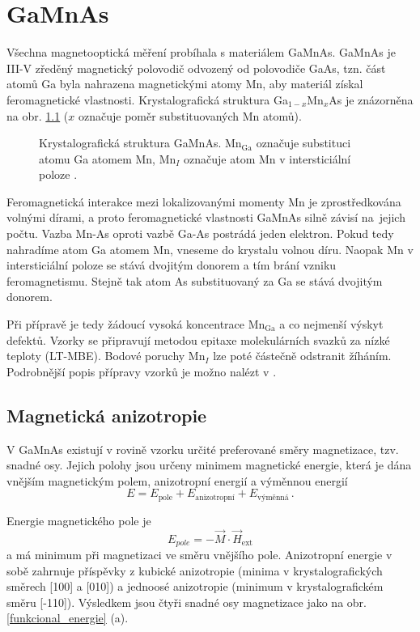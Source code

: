 \chapter{GaMnAs}

Všechna magnetooptická měření probíhala s materiálem GaMnAs. GaMnAs je III-V zředěný magnetický polovodič odvozený od polovodiče GaAs, tzn. část atomů Ga byla nahrazena magnetickými atomy Mn, aby materiál získal feromagnetické vlastnosti. Krystalografická struktura Ga$_{1-x}$Mn$_x$As je znázorněna na obr. \ref{gamnasstruktura_reichlova} ($x$ označuje poměr substituovaných Mn atomů).


\begin{figure}[htbp]\centering
{}
	\caption{Krystalografická struktura GaMnAs. Mn$_\text{Ga}$ označuje substituci atomu Ga atomem Mn, Mn$_I$ označuje atom Mn v intersticiální poloze \cite{Reichlova}.}\label{gamnasstruktura_reichlova}
\end{figure}

Feromagnetická interakce mezi lokalizovanými momenty Mn je zprostředkována volnými dírami, a proto feromagnetické vlastnosti GaMnAs silně závisí na~jejich počtu. Vazba Mn-As oproti vazbě Ga-As postrádá jeden elektron. Pokud tedy nahradíme atom Ga atomem Mn, vneseme do krystalu volnou díru. Naopak Mn v intersticiální poloze se stává dvojitým donorem a tím brání vzniku feromagnetismu. Stejně tak atom As substituovaný za Ga se stává dvojitým donorem.

Při přípravě je tedy žádoucí vysoká koncentrace Mn$_\text{Ga}$ a co nejmenší výskyt defektů. 
Vzorky se připravují metodou epitaxe molekulárních svazků za nízké teploty (LT-MBE). Bodové poruchy Mn$_I$ lze poté částečně odstranit žíháním.
Podrobnější popis přípravy vzorků je možno nalézt v \cite{Reichlova}.

\section{Magnetická anizotropie}

V GaMnAs existují v rovině vzorku určité preferované směry magnetizace, tzv. snadné osy. Jejich polohy jsou určeny minimem magnetické energie, která je dána vnějším magnetickým polem, anizotropní energií a výměnnou energií \cite{Reichlova}
\begin{equation}
E=E_\text{pole}+E_\text{anizotropní}+E_\text{výměnná} \,.
\end{equation}

Energie magnetického pole je
\begin{equation}
E_{pole}=-\vec{M}\cdot\vec{H}_\text{ext}
\end{equation}
a má minimum při magnetizaci ve směru vnějšího pole.
Anizotropní energie v sobě zahrnuje příspěvky z kubické anizotropie (minima v krystalografických směrech [100] a [010]) a jednoosé anizotropie (minimum v krystalografickém směru [-110]). 
Výsledkem jsou čtyři snadné osy magnetizace jako na obr. \ref{funkcional_energie} (a).

